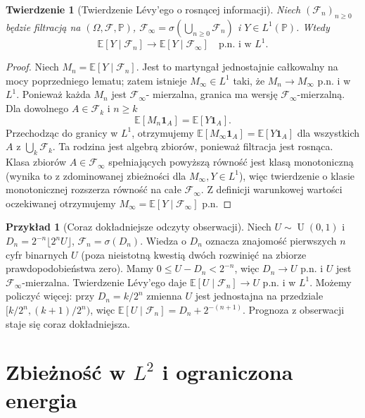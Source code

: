 \documentclass[11pt,a4paper,oneside]{report}
\numberwithin{equation}{chapter}
\theoremstyle{plain}
\newtheorem{twierdzenie}{Twierdzenie}[chapter]
\theoremstyle{definition}
\newtheorem{przyklad}{Przykład}[chapter]
\theoremstyle{remark}
\newcommand{\Prob}{\mathbb{P}}
\newcommand{\E}{\mathbb{E}}
\newcommand{\ind}[1]{\mathbf{1}_{#1}}
\newcommand{\Unif}{\operatorname{U}}
\begin{document}
\begin{twierdzenie}[Twierdzenie Lévy'ego o rosnącej informacji]
Niech $(\mathcal F_n)_{n\geq0}$ będzie filtracją
na $(\Omega,\mathcal F,\Prob)$,
$\mathcal F_\infty=\sigma(\bigcup_{n\geq0}\mathcal F_n)$
i $Y\in L^1(\Prob)$. Wtedy
\[
\E[Y\mid\mathcal F_n]
\longrightarrow\E[Y\mid\mathcal F_\infty]
\quad\text{p.n. i w }L^1.
\]
\end{twierdzenie}
\begin{proof}
Niech $M_n=\E[Y\mid\mathcal F_n]$.
Jest to martyngał jednostajnie całkowalny
na mocy poprzedniego lematu; zatem istnieje
$M_\infty\in L^1$ taki, że $M_n\to M_\infty$
p.n. i w $L^1$.
Ponieważ każda $M_n$ jest $\mathcal F_\infty$-
mierzalna, granica ma wersję
$\mathcal F_\infty$-mierzalną.
Dla dowolnego $A\in\mathcal F_k$ i $n\geq k$
\[
\E[M_n\ind A]=\E[Y\ind A].
\]
Przechodząc do granicy w $L^1$, otrzymujemy
$\E[M_\infty\ind A]=\E[Y\ind A]$
dla wszystkich $A$ z $\bigcup_k\mathcal F_k$.
Ta rodzina jest algebrą zbiorów, ponieważ
filtracja jest rosnąca. Klasa zbiorów
$A\in\mathcal F_\infty$ spełniających powyższą
równość jest klasą monotoniczną (wynika to
z zdominowanej zbieżności dla
$M_\infty,Y\in L^1$), więc twierdzenie
o klasie monotonicznej rozszerza równość
na całe $\mathcal F_\infty$.
Z definicji warunkowej wartości oczekiwanej
otrzymujemy
$M_\infty=\E[Y\mid\mathcal F_\infty]$ p.n.
\end{proof}

\begin{przyklad}[Coraz dokładniejsze odczyty obserwacji]
Niech $U\sim\Unif(0,1)$ i
$D_n=2^{-n}\lfloor2^nU\rfloor$,
$\mathcal F_n=\sigma(D_n)$.
Wiedza o $D_n$ oznacza znajomość pierwszych
$n$ cyfr binarnych $U$ (poza nieistotną
kwestią dwóch rozwinięć na zbiorze
prawdopodobieństwa zero). Mamy
$0\leq U-D_n<2^{-n}$, więc $D_n\to U$ p.n.
i $U$ jest $\mathcal F_\infty$-mierzalna.
Twierdzenie Lévy'ego daje
$\E[U\mid\mathcal F_n]\to U$ p.n. i w $L^1$.
Możemy policzyć więcej: przy $D_n=k/2^n$
zmienna $U$ jest jednostajna na przedziale
$[k/2^n,(k+1)/2^n)$, więc
$\E[U\mid\mathcal F_n]=D_n+2^{-(n+1)}$.
Prognoza z obserwacji staje się coraz dokładniejsza.
\end{przyklad}

\section{Zbieżność w \texorpdfstring{$L^2$}{L2} i ograniczona energia}
\end{document}
